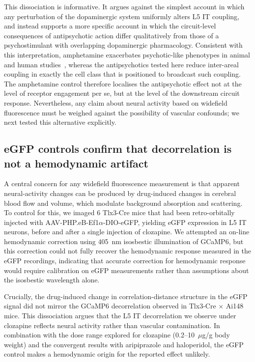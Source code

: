 \documentclass[11pt]{article}
\begin{document}
This dissociation is informative. It argues against the simplest account in which any perturbation of the dopaminergic system uniformly alters L5 IT coupling, and instead supports a more specific account in which the circuit-level consequences of antipsychotic action differ qualitatively from those of a psychostimulant with overlapping dopaminergic pharmacology. Consistent with this interpretation, amphetamine exacerbates psychotic-like phenotypes in animal and human studies~\citep{howes2009dopamine, kambeitz2014alterations}, whereas the antipsychotics tested here reduce inter-areal coupling in exactly the cell class that is positioned to broadcast such coupling. The amphetamine control therefore localises the antipsychotic effect not at the level of receptor engagement per se, but at the level of the downstream circuit response. Nevertheless, any claim about neural activity based on widefield fluorescence must be weighed against the possibility of vascular confounds; we next tested this alternative explicitly.

\subsection{eGFP controls confirm that decorrelation is not a hemodynamic artifact}

A central concern for any widefield fluorescence measurement is that apparent neural-activity changes can be produced by drug-induced changes in cerebral blood flow and volume, which modulate background absorption and scattering. To control for this, we imaged 6 Tlx3-Cre mice that had been retro-orbitally injected with AAV-PHP.eB-Ef1$\alpha$-DIO-eGFP, yielding eGFP expression in L5 IT neurons, before and after a single injection of clozapine. We attempted an on-line hemodynamic correction using 405~nm isosbestic illumination of GCaMP6, but this correction could not fully recover the hemodynamic response measured in the eGFP recordings, indicating that accurate correction for hemodynamic response would require calibration on eGFP measurements rather than assumptions about the isosbestic wavelength alone.

Crucially, the drug-induced change in correlation-distance structure in the eGFP signal did not mirror the GCaMP6 decorrelation observed in Tlx3-Cre $\times$ Ai148 mice. This dissociation argues that the L5 IT decorrelation we observe under clozapine reflects neural activity rather than vascular contamination. In combination with the dose range explored for clozapine (0.2--10~$\mu$g/g body weight) and the convergent results with aripiprazole and haloperidol, the eGFP control makes a hemodynamic origin for the reported effect unlikely.
\end{document}
